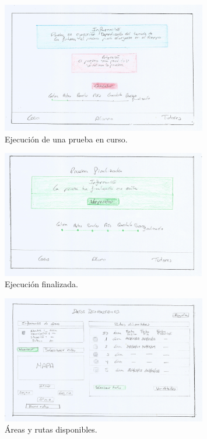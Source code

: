 \begin{figure}[!htbp]
  \centering
    \includegraphics[width=0.8\textwidth]{../img/prototipado/alta/encurso.png}
  \caption{Ejecución de una prueba en curso.}
  \label{encurso}
\end{figure}

\begin{figure}[!htbp]
  \centering
    \includegraphics[width=0.8\textwidth]{../img/prototipado/alta/ejecucionfin.png}
  \caption{Ejecución finalizada.}
  \label{ejecucionfin}
\end{figure}

\begin{figure}[!htbp]
  \centering
    \includegraphics[width=0.8\textwidth]{../img/prototipado/alta/datosdisponibles.png}
  \caption{Áreas y rutas disponibles.}
  \label{datosdisponibles}
\end{figure}

